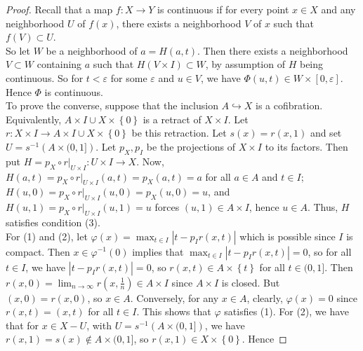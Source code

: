 \documentclass[reqno]{amsart}
\theoremstyle{definition}
\theoremstyle{remark}
\begin{document}
\begin{proof}
    Recall that a map $f \colon X \to Y$ is continuous
    if for every point $x \in X$ and any neighborhood
    $U$ of $f(x)$, there exists a neighborhood
    $V$ of $x$ such that $f(V) \subset U$.\\
    So let $W$ be a neighborhood of $a = 
    H(a,t)$. Then there exists a neighborhood
    $V \subset W$ containing $a$ such that
    $H\left( V \times I \right) \subset W$, by
    assumption of $H$ being continuous.
    So for $t < \varepsilon$ for some $\varepsilon$ and
    $u \in V$, we have
    $\Phi \left( u,t \right) 
    \in W \times \left[ 0,\varepsilon \right] $.
    Hence $\Phi$ is continuous.\\
    \linebreak
    To prove the converse, suppose that the
    inclusion $A \hookrightarrow X$ is a cofibration. Equivalently,
    $A \times I \cup  X \times \left\{ 0 \right\} $ is
    a retract of $X \times I$. Let $r
    \colon X \times I \to  A \times I \cup X \times
    \left\{ 0 \right\} $ be this retraction.
    Let $s(x) = r\left( x,1 \right) $ and set
    $U = s^{-1}\left( A \times (0,1] \right) $.
    Let $p_X, p_I$ be the projections of
    $X \times I$ to its factors. Then
    put $H = p_X \circ r|_{U \times I} \colon U \times I \to X$.
    Now, $H(a,t) = p_X \circ r |_{U \times I}(a,t)
    = p_X \left( a,t \right) = a$ for all
    $a \in A$ and $t \in I$;
    $H(u,0) = p_X \circ r|_{U \times I}(u,0) =
    p_X \left( u,0 \right) = u$, and
    $H\left( u,1 \right) =
    p_X \circ r|_{U \times I}(u,1) = 
    u$ forces $(u,1) \in A \times I$, hence
    $u \in A$. Thus, $H$ satisfies condition (3).\\
    For (1) and (2), let
    $\varphi (x) = 
    \max_{t \in I} \left| t - p_I r(x,t) \right| $ which
    is possible since $I$ is compact. Then
    $x \in \varphi^{-1}(0)$ implies that
    $\max_{t \in I} \left| t - p_I r(x,t) \right| = 0$, so
    for all $t \in I$, we have
    $\left| t - p_I r(x,t) \right| = 0$, so
    $r(x,t) \in A \times \left\{ t \right\} $ for all
    $t \in (0,1]$. Then
    $r\left( x,0 \right) = \lim_{n \to \infty}
    r\left( x, \frac{1}{n} \right) 
    \in A \times I$ since $A \times I$ is closed. But
    $(x,0) = r(x,0)$, so $x \in A$. Conversely, for any
    $x \in A$, clearly, $\varphi (x) = 0$ since
    $r(x,t) = (x,t)$ for all $t \in I$. This shows that
    $\varphi $ satisfies (1). 
    For (2), we have that for
    $x \in X -U$, with $U = 
    s^{-1}\left( A \times (0,1] \right) $, we
    have $r(x,1) = s(x) \not\in A \times (0,1]$, so
    $r(x,1) \in X \times \left\{ 0 \right\} $. Hence

\end{proof}
\end{document}
